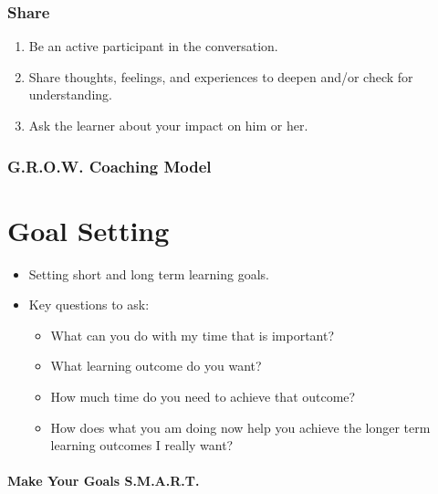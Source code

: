 \documentclass[
]{book}
\providecommand{\tightlist}{%
  \setlength{\itemsep}{0pt}\setlength{\parskip}{0pt}}
\begin{document}
\hypertarget{share}{%
\subsubsection*{Share}\label{share}}

\begin{enumerate}
\def\labelenumi{\arabic{enumi}.}
\tightlist
\item
  Be an active participant in the conversation.
\item
  Share thoughts, feelings, and experiences to deepen and/or check for understanding.
\item
  Ask the learner about your impact on him or her.
\end{enumerate}

\hypertarget{g.r.o.w.-coaching-model}{%
\subsubsection*{G.R.O.W. Coaching Model}\label{g.r.o.w.-coaching-model}}

\hypertarget{goal-setting}{%
\section*{Goal Setting}\label{goal-setting}}

\begin{itemize}
\tightlist
\item
  Setting short and long term learning goals.
\item
  Key questions to ask:

  \begin{itemize}
  \tightlist
  \item
    What can you do with my time that is important?
  \item
    What learning outcome do you want?
  \item
    How much time do you need to achieve that outcome?
  \item
    How does what you am doing now help you achieve the longer term learning outcomes I really want?
  \end{itemize}
\end{itemize}

\hypertarget{make-your-goals-s.m.a.r.t.}{%
\paragraph*{Make Your Goals S.M.A.R.T.}\label{make-your-goals-s.m.a.r.t.}}
\end{document}
